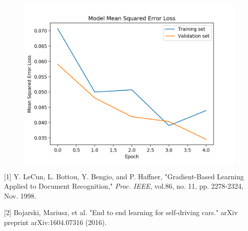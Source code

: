 \documentclass[12pt]{article}
\begin{document}
\begin{figure}[H]
\centering
\includegraphics[scale = 1]{train_validation_loss.png}
\end{figure}

[1] Y. LeCun, L. Bottou, Y. Bengio, and P. Haffner, "Gradient-Based Learning Applied to Document Recognition," \textit{Proc. IEEE}, vol.86, no. 11, pp. 2278-2324, Nov. 1998.

[2] Bojarski, Mariusz, et al. "End to end learning for self-driving cars." arXiv preprint arXiv:1604.07316 (2016).
\end{document}
